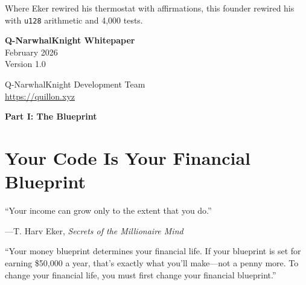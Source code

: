 \documentclass[11pt,a4paper]{article}
\begin{document}
\begin{titlepage}
\begin{tcolorbox}[
    colback=qnkblue!5,
    colframe=qnkblue!60,
    width=0.85\textwidth,
    arc=6pt,
    boxrule=1pt,
    left=12pt,
    right=12pt,
    top=10pt,
    bottom=10pt,
]
Where Eker rewired his thermostat with affirmations, this founder
rewired his with \texttt{u128} arithmetic and 4{,}000 tests.
\end{tcolorbox}

\vspace{1cm}

{\large\bfseries Q-NarwhalKnight Whitepaper\\[0.3cm]}
{\large February 2026\\[0.5cm]}
{\color{gray}\small Version 1.0}

\vfill


\vspace{0.3cm}

{\small\color{gray}
Q-NarwhalKnight Development Team\\
\url{https://quillon.xyz}
}
\end{titlepage}

\newpage
\tableofcontents
\newpage


\begin{center}
{\LARGE\bfseries\color{qnkblue} Part I: The Blueprint}\\[0.3cm]
\end{center}
\vspace{0.5cm}

\section{Your Code Is Your Financial Blueprint}

\epigraph{``Your income can grow only to the extent that you do.''}%
{---T. Harv Eker, \emph{Secrets of the Millionaire Mind}}

\begin{wealthbox}[title={\raisebox{-0.5pt}{\tiny$\bigstar$} Wealth File \#1}]
``Your money blueprint determines your financial life. If your blueprint
is set for earning \$50,000 a year, that's exactly what you'll make---not
a penny more. To change your financial life, you must first change your
financial blueprint.''
\end{wealthbox}
\end{document}

